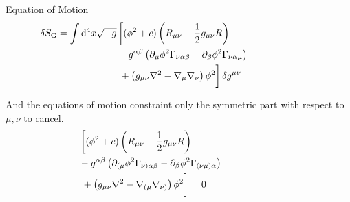 \begin{section}{Equation of Motion}
  \begin{align}
    \delta S_\mathrm{G} = \int\mathrm d^4x\sqrt{-g}&\left[(\phi^2+c)\left(R_{\mu\nu}-\frac{1}{2}g_{\mu\nu}R\right)\hphantom{\left(g_{\mu\nu}\nabla^2-\nabla_\mu\nabla_\nu\right)\phi^2}\right.\\
      &-g^{\alpha\beta}\left(\partial_\mu\phi^2\Gamma_{\nu\alpha\beta}-\partial_\beta\phi^2\Gamma_{\nu\alpha\mu}\right)\\
      &\left.\vphantom{(\phi^2+c)\left(R_{\mu\nu}-\frac{1}{2}g_{\mu\nu}R\right)}+\left(g_{\mu\nu}\nabla^2-\nabla_\mu\nabla_\nu\right)\phi^2\right]\delta g^{\mu\nu}
  \end{align}

  And the equations of motion constraint only the symmetric part with respect to $\mu,\nu$ to cancel.
  \begin{align}
    &\left[(\phi^2+c)\left(R_{\mu\nu}-\frac{1}{2}g_{\mu\nu}R\right)\hphantom{\left(g_{\mu\nu}\nabla^2-\nabla_\mu\nabla_\nu\right)\phi^2}\right.\\
      &-g^{\alpha\beta}\left(\partial_{(\mu}\phi^2\Gamma_{\nu)\alpha\beta}-\partial_\beta\phi^2\Gamma_{(\nu\mu)\alpha}\right)\\
      &\left.\vphantom{(\phi^2+c)\left(R_{\mu\nu}-\frac{1}{2}g_{\mu\nu}R\right)}+\left(g_{\mu\nu}\nabla^2-\nabla_{(\mu}\nabla_{\nu)}\right)\phi^2\right] = 0
  \end{align}
\end{section}
